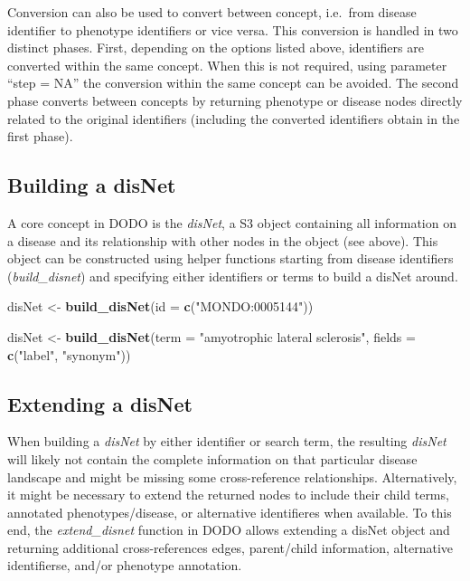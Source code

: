 \documentclass[9pt,a4paper,]{extarticle}
\newenvironment{Shaded}{\begin{snugshade}}{\end{snugshade}}
\newcommand{\DataTypeTok}[1]{\textcolor[rgb]{0.13,0.29,0.53}{#1}}
\newcommand{\KeywordTok}[1]{\textcolor[rgb]{0.13,0.29,0.53}{\textbf{#1}}}
\newcommand{\NormalTok}[1]{#1}
\newcommand{\StringTok}[1]{\textcolor[rgb]{0.31,0.60,0.02}{#1}}
\begin{document}
Conversion can also be used to convert between concept, i.e.~from disease identifier to phenotype identifiers or vice versa. This conversion is handled in two distinct phases. First, depending on the options listed above, identifiers are converted within the same concept. When this is not required, using parameter ``step = NA'' the conversion within the same concept can be avoided. The second phase converts between concepts by returning phenotype or disease nodes directly related to the original identifiers (including the converted identifiers obtain in the first phase).

\hypertarget{building-a-disnet}{%
\subsection{Building a disNet}\label{building-a-disnet}}

A core concept in DODO is the \emph{disNet}, a S3 object containing all information on a disease and its relationship with other nodes in the object (see above). This object can be constructed using helper functions starting from disease identifiers (\emph{build\_disnet}) and specifying either identifiers or terms to build a disNet around.

\begin{Shaded}
\begin{Highlighting}[]
\NormalTok{disNet <-}\StringTok{ }\KeywordTok{build_disNet}\NormalTok{(}\DataTypeTok{id =} \KeywordTok{c}\NormalTok{(}\StringTok{"MONDO:0005144"}\NormalTok{))}

\NormalTok{disNet <-}\StringTok{ }\KeywordTok{build_disNet}\NormalTok{(}\DataTypeTok{term =} \StringTok{"amyotrophic lateral sclerosis"}\NormalTok{, }
                       \DataTypeTok{fields =} \KeywordTok{c}\NormalTok{(}\StringTok{"label"}\NormalTok{, }\StringTok{"synonym"}\NormalTok{))}
\end{Highlighting}
\end{Shaded}

\hypertarget{extending-a-disnet}{%
\subsection{Extending a disNet}\label{extending-a-disnet}}

When building a \emph{disNet} by either identifier or search term, the resulting \emph{disNet} will likely not contain the complete information on that particular disease landscape and might be missing some cross-reference relationships. Alternatively, it might be necessary to extend the returned nodes to include their child terms, annotated phenotypes/disease, or alternative identifieres when available. To this end, the \emph{extend\_disnet} function in DODO allows extending a disNet object and returning additional cross-references edges, parent/child information, alternative identifierse, and/or phenotype annotation.
\end{document}
